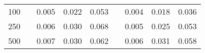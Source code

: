 % 
\begin{tabular}{ccccccccc}
  \hline
  \hline
100 &  & 0.005 & 0.022 & 0.053 &  & 0.004 & 0.018 & 0.036 \\ 
  250 &  & 0.006 & 0.030 & 0.068 &  & 0.005 & 0.025 & 0.053 \\ 
  500 &  & 0.007 & 0.030 & 0.062 &  & 0.006 & 0.031 & 0.058 \\ 
   \hline
\end{tabular}
